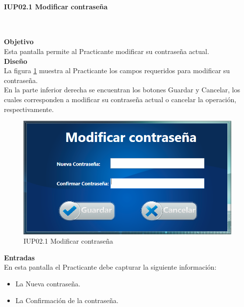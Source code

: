 \paragraph{IUP02.1 Modificar contraseña} \hspace{1cm}\\ 
\label{pant:IUP02.1}

\textbf{\textcolor[rgb]{0, 0, 0.545098} {Objetivo}}\\
Esta pantalla permite al Practicante modificar su contraseña actual.\\

\textbf{\textcolor[rgb]{0, 0, 0.545098}{Diseño}}\\
La figura \ref{fig:IUP02.1} muestra al Practicante los campos requeridos para modificar su contraseña. \\

En la parte inferior derecha se encuentran los botones Guardar y Cancelar, los cuales corresponden a modificar su contraseña actual o cancelar la operación, respectivamente.\\

\begin{figure}[H]
	\centering
		\includegraphics[scale=0.8]{./Figuras/Pantallas/IUP02_1Modificar_contrasena}
	\caption{IUP02.1 Modificar contraseña}
	\label{fig:IUP02.1}
\end{figure}

\textbf{\textcolor[rgb]{0, 0, 0.545098}{Entradas}}\\
En esta pantalla el Practicante debe capturar la siguiente información:

\begin{itemize}
	\item La Nueva contraseña.
	\item La Confirmación de la contraseña.
\end{itemize}

